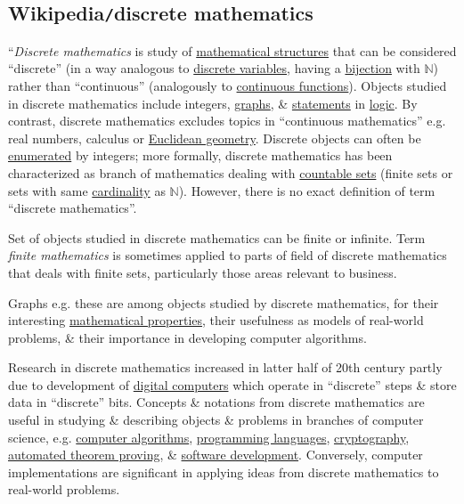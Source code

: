 \documentclass{article}
\begin{document}
\subsection{Wikipedia{\tt/}discrete mathematics}
``{\it Discrete mathematics} is study of \href{https://en.wikipedia.org/wiki/Mathematical_structures}{mathematical structures} that can be considered ``discrete'' (in a way analogous to \href{https://en.wikipedia.org/wiki/Discrete_variable}{discrete variables}, having a \href{https://en.wikipedia.org/wiki/Bijection}{bijection} with $\mathbb{N}$) rather than ``continuous'' (analogously to \href{https://en.wikipedia.org/wiki/Continuous_function}{continuous functions}). Objects studied in discrete mathematics include integers, \href{https://en.wikipedia.org/wiki/Graph_(discrete_mathematics)}{graphs}, \& \href{https://en.wikipedia.org/wiki/Statement_(logic)}{statements} in \href{https://en.wikipedia.org/wiki/Mathematical_logic}{logic}. By contrast, discrete mathematics excludes topics in ``continuous mathematics'' e.g. real numbers, calculus or \href{https://en.wikipedia.org/wiki/Euclidean_geometry}{Euclidean geometry}. Discrete objects can often be \href{https://en.wikipedia.org/wiki/Enumeration}{enumerated} by integers; more formally, discrete mathematics has been characterized as branch of mathematics dealing with \href{https://en.wikipedia.org/wiki/Countable_set}{countable sets} (finite sets or sets with same \href{https://en.wikipedia.org/wiki/Cardinality}{cardinality} as $\mathbb{N}$). However, there is no exact definition of term ``discrete mathematics''.

Set of objects studied in discrete mathematics can be finite or infinite. Term {\it finite mathematics} is sometimes applied to parts of field of discrete mathematics that deals with finite sets, particularly those areas relevant to business.

{\sf Graphs e.g. these are among objects studied by discrete mathematics, for their interesting \href{https://en.wikipedia.org/wiki/Graph_property}{mathematical properties}, their usefulness as models of real-world problems, \& their importance in developing computer algorithms.}

Research in discrete mathematics increased in latter half of 20th century partly due to development of \href{https://en.wikipedia.org/wiki/Digital_computers}{digital computers} which operate in ``discrete'' steps \& store data in ``discrete'' bits. Concepts \& notations from discrete mathematics are useful in studying \& describing objects \& problems in branches of computer science, e.g. \href{https://en.wikipedia.org/wiki/Computer_algorithm}{computer algorithms}, \href{https://en.wikipedia.org/wiki/Programming_language}{programming languages}, \href{https://en.wikipedia.org/wiki/Cryptography}{cryptography}, \href{https://en.wikipedia.org/wiki/Automated_theorem_proving}{automated theorem proving}, \& \href{https://en.wikipedia.org/wiki/Software_development}{software development}. Conversely, computer implementations are significant in applying ideas from discrete mathematics to real-world problems.
\end{document}
